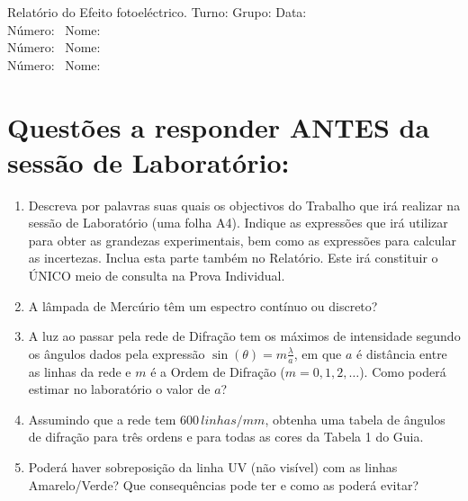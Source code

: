 \documentclass[a4paper,12pt]{article}  %
\author{Prof. Bernardo B. Carvalho}
\date{ Outubro 2014}
\newcommand{\HRule}{\rule{\linewidth}{0.5mm}}
\begin{document}
 



{  \sf  Relatório do Efeito fotoeléctrico.} %
Turno:\underline{\makebox[0.7cm][l]{~}} Grupo:\underline{\makebox[0.7cm][l]{~}} Data:\underline{\makebox[2cm][l]{~}}\\
\noindent Número:~\underline{\makebox[2cm][r]{~}} Nome:~\underline{\makebox[10cm][r]{~}} \\
\noindent Número:~\underline{\makebox[2cm][r]{~}} Nome:~\underline{\makebox[10cm][r]{~}} \\
\noindent Número:~\underline{\makebox[2cm][r]{~}} Nome:~\underline{\makebox[10cm][r]{~}} 


\section{\sf Questões a responder ANTES da sessão de Laboratório:}
\begin{enumerate}
\item Descreva por palavras suas quais os objectivos do Trabalho que irá realizar na sessão de Laboratório (uma folha A4). Indique as expressões que irá utilizar para obter as grandezas experimentais, bem como as expressões para calcular as incertezas. Inclua esta parte também no Relatório. Este irá constituir o ÚNICO meio de consulta na Prova Individual.

\item A lâmpada de Mercúrio têm um espectro contínuo ou discreto?
\item A luz ao passar pela rede de Difração tem os máximos de intensidade segundo os ângulos dados pela expressão $\sin(\theta) = m \frac{\lambda}{a}$, em que $a$ é distância entre as linhas da rede e $m$ é a Ordem de Difração ($m=0,1,2,\ldots$). Como poderá estimar no laboratório o valor de $a$?
\item Assumindo que a rede tem $600\,linhas/mm$, obtenha uma tabela de ângulos de difração para três ordens e para todas as cores da Tabela 1 do Guia.
\item Poderá haver sobreposição da linha UV (não visível) com as linhas Amarelo/Verde? Que consequências pode ter e como as poderá evitar?

\end{enumerate}
\end{document}
